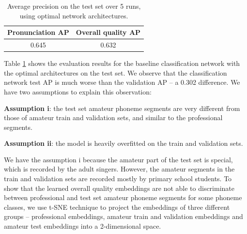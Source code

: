 \begin{table}[ht!]
\centering
\caption{Average precision on the test set over 5 runs, using optimal network architectures.}
\label{tab:ch7:baseline_test}
\begin{tabular}{cc}
\toprule
Pronunciation AP & Overall quality AP \\
\midrule
0.645            & 0.632     \\
\bottomrule
\end{tabular}
\end{table}

Table \ref{tab:ch7:baseline_test} shows the evaluation results for the baseline classification network with the optimal architectures on the test set. We observe that the classification network test AP is much worse than the validation AP -- a 0.302 difference. We have two assumptions to explain this observation:

\textbf{Assumption i}: the test set amateur phoneme segments are very different from those of amateur train and validation sets, and similar to the professional segments. 

\textbf{Assumption ii}: the model is heavily overfitted on the train and validation sets.

We have the assumption i because the amateur part of the test set is special, which is recorded by the adult singers. However, the amateur segments in the train and validation sets are recorded mostly by primary school students. To show that the learned overall quality embeddings are not able to discriminate between professional and test set amateur phoneme segments for some phoneme classes, we use t-SNE technique \cite{VanDerMaaten2008} to project the embeddings of three different groups -- professional embeddings, amateur train and validation embeddings and amateur test embeddings into a 2-dimensional space.

